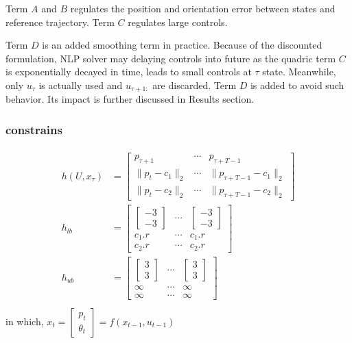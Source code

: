 \documentclass[conference]{IEEEtran}
\begin{document}
Term $A$ and $B$ regulates the position and orientation error 
between states and reference trajectory.
Term $C$ regulates large controls.

Term $D$ is an added smoothing term in practice.
Because of the discounted formulation, NLP solver may
delaying controls into future as the quadric term $C$ is exponentially decayed in time,
leads to small controls at $\tau$ state.
Meanwhile, only $u_\tau$ is actually used and $u_{\tau+1:}$ are discarded.
Term $D$ is added to avoid such behavior. 
Its impact is further discussed in Results section.

\subsubsection{constrains}
\[
\begin{gathered}
\begin{aligned}
h(U, x_\tau)&=\left[ \begin{matrix}p_{\tau +1}&\cdots &p_{\tau +T-1}\\ \| p_{t}-c_{1}\|_{2} &\cdots &\| p_{\tau +T-1}-c_{1}\|_{2} \\ \| p_{t}-c_{2}\|_{2} &\cdots &\| p_{\tau +T-1}-c_{2}\|_2 \end{matrix}  \right] \\ 
h_{lb}&=\left[ \begin{matrix}\left[ \begin{gathered}-3\\ -3 \end{gathered}  \right] &\cdots &\left[ \begin{gathered}-3\\ -3 \end{gathered}  \right] \\ c_{1}.r&\cdots &c_{1}.r\\ c_{2}.r&\cdots &c_{2}.r\end{matrix}  \right] \\ 
h_{ub}&=\left[ \begin{matrix}\left[ \begin{gathered} 3\\  3 \end{gathered}  \right] &\cdots &\left[ \begin{gathered} 3\\  3 \end{gathered}  \right] \\ \infty&\cdots &\infty\\ \infty&\cdots &\infty\end{matrix}  \right] 
\end{aligned} \\
\end{gathered} 
\]
in which, 
\( x_{t} = \left[ \begin{gathered}p_{t}\\ \theta_{t} \end{gathered}  \right]  
=f(x_{t-1},u_{t-1}) \)
\end{document}
